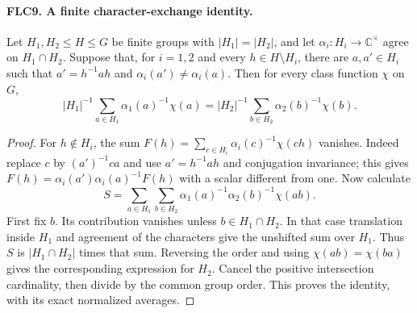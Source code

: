 \documentclass[11pt,a4paper]{article}
\numberwithin{equation}{section}
\theoremstyle{remark}\newtheorem{remark}[theorem]{Remark}
\begin{document}
\paragraph{FLC9. A finite character-exchange identity.}
\label{claim:FLC9}
Let $H_1,H_2\le H\le G$ be finite groups with
$|H_1|=|H_2|$, and let $\alpha_i:H_i\to\mathbb C^\times$
agree on $H_1\cap H_2$.
Suppose that, for $i=1,2$ and every $h\in H\setminus H_i$,
there are $a,a'\in H_i$ such that
$a'=h^{-1}ah$ and $\alpha_i(a')\ne\alpha_i(a)$.
Then for every class function $\chi$ on $G$,
\[
 |H_1|^{-1}\sum_{a\in H_1}\alpha_1(a)^{-1}\chi(a)
       =|H_2|^{-1}\sum_{b\in H_2}\alpha_2(b)^{-1}\chi(b).
 \tag{FLC.14}
\]
\begin{proof}
For $h\notin H_i$, the sum
$F(h)=\sum_{c\in H_i}\alpha_i(c)^{-1}\chi(ch)$ vanishes.
Indeed replace $c$ by $(a')^{-1}ca$ and use
$a'=h^{-1}ah$ and conjugation invariance; this gives
$F(h)=\alpha_i(a')\alpha_i(a)^{-1}F(h)$ with a scalar
different from one.
Now calculate
\[
 S=\sum_{a\in H_1}\sum_{b\in H_2}
        \alpha_1(a)^{-1}\alpha_2(b)^{-1}\chi(ab).
\]
First fix $b$.  Its contribution vanishes unless
$b\in H_1\cap H_2$.  In that case translation inside $H_1$
and agreement of the characters give the unshifted sum over
$H_1$.  Thus $S$ is $|H_1\cap H_2|$ times that sum.
Reversing the order and using $\chi(ab)=\chi(ba)$ gives the
corresponding expression for $H_2$.  Cancel the positive
intersection cardinality, then divide by the common group
order.  This proves the identity, with its exact normalized
averages.
\end{proof}

\end{document}
